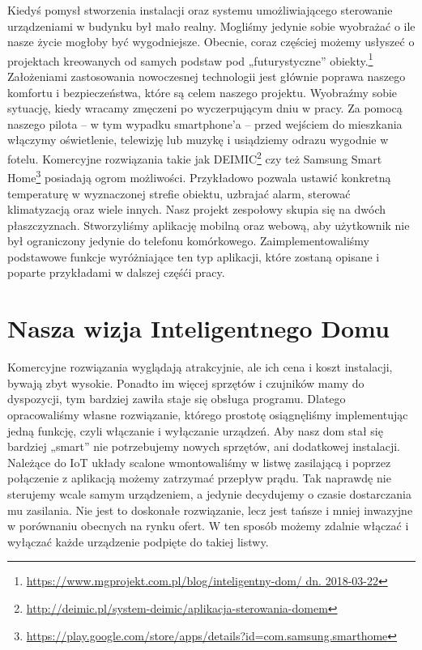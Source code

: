 \documentclass{xmgr}
\begin{document}
\introduction
Kiedyś pomysł stworzenia instalacji oraz systemu umożliwiającego sterowanie urządzeniami w budynku był mało realny. Mogliśmy jedynie sobie wyobrażać o ile nasze życie mogłoby być wygodniejsze. Obecnie, coraz częściej możemy usłyszeć o projektach kreowanych od samych podstaw pod „futurystyczne” obiekty.\footnote{\url{https://www.mgprojekt.com.pl/blog/inteligentny-dom/ dn. 2018-03-22}} Założeniami zastosowania nowoczesnej technologii jest głównie poprawa naszego komfortu i bezpieczeństwa, które są celem naszego projektu. Wyobraźmy sobie sytuację, kiedy wracamy zmęczeni po wyczerpującym dniu w pracy. Za pomocą naszego pilota -- w tym wypadku smartphone'a -- przed wejściem do mieszkania włączymy oświetlenie, telewizję lub muzykę i usiądziemy odrazu wygodnie w fotelu. Komercyjne rozwiązania takie jak DEIMIC\footnote{\url{http://deimic.pl/system-deimic/aplikacja-sterowania-domem}} czy też Samsung Smart Home\footnote{\url{https://play.google.com/store/apps/details?id=com.samsung.smarthome}} posiadają ogrom możliwości. Przykładowo pozwala ustawić konkretną temperaturę w wyznaczonej strefie obiektu, uzbrajać alarm, sterować klimatyzacją oraz wiele innych. Nasz projekt zespołowy skupia się na dwóch płaszczyznach. Stworzyliśmy aplikację mobilną oraz webową, aby użytkownik nie był ograniczony jedynie do telefonu komórkowego. Zaimplementowaliśmy podstawowe funkcje wyróżniające ten typ aplikacji, które zostaną opisane i poparte przykładami w dalszej częśći pracy.


\chapter{Nasza wizja Inteligentnego Domu}
Komercyjne rozwiązania wyglądają atrakcyjnie, ale ich cena i koszt instalacji, bywają zbyt wysokie. Ponadto im więcej sprzętów i czujników mamy do dyspozycji, tym bardziej zawiła staje się obsługa programu. Dlatego opracowaliśmy własne rozwiązanie, którego prostotę osiągnęliśmy implementując jedną funkcję, czyli włączanie i wyłączanie urządzeń. Aby nasz dom stał się bardziej „smart” nie potrzebujemy nowych sprzętów, ani dodatkowej instalacji. Należące do IoT układy scalone wmontowaliśmy w listwę zasilającą i poprzez połączenie z aplikacją możemy zatrzymać przepływ prądu. Tak naprawdę nie sterujemy wcale samym urządzeniem, a jedynie decydujemy o czasie dostarczania mu zasilania. Nie jest to doskonałe rozwiązanie, lecz jest tańsze i mniej inwazyjne w porównaniu obecnych na rynku ofert. W ten sposób możemy zdalnie włączać i wyłączać każde urządzenie podpięte do takiej listwy.    
\end{document}
